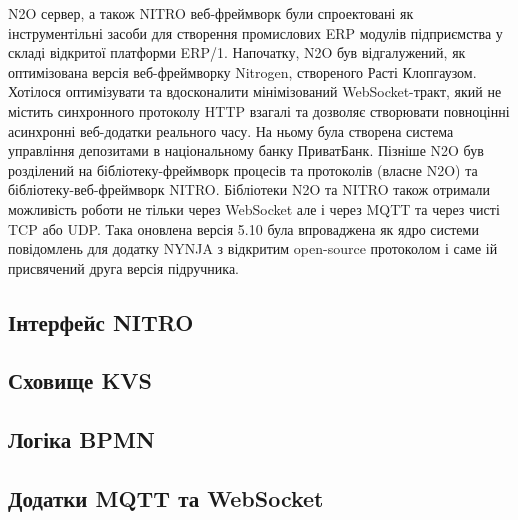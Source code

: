 N2O сервер, а також NITRO веб-фреймворк були спроектовані як інструментільні засоби
для створення промислових ERP модулів підприємства у складі відкритої платформи ERP/1.
Напочатку, N2O був відгалужений, як оптимізована версія веб-фреймворку Nitrogen,
створеного Расті Клопгаузом. Хотілося оптимізувати та вдосконалити мінімізований
WebSocket-тракт, який не містить синхронного протоколу HTTP взагалі та дозволяє
створювати повноцінні асинхронні веб-додатки реального часу. На ньому була створена
система управління депозитами в національному банку ПриватБанк. Пізніше N2O був розділений
на бібліотеку-фреймворк процесів та протоколів (власне N2O) та бібліотеку-веб-фреймворк NITRO.
Бібліотеки N2O та NITRO також отримали можливість роботи не тільки через WebSocket але і
через MQTT та через чисті TCP або UDP. Така оновлена версія 5.10 була впроваджена як ядро
системи повідомлень для додатку NYNJA з відкритим open-source протоколом і саме ій
присвячений друга версія підручника.

\newpage
\subsection{Інтерфейс NITRO}

\subsection{Сховище KVS}

\subsection{Логіка BPMN}

\subsection{Додатки MQTT та WebSocket}
